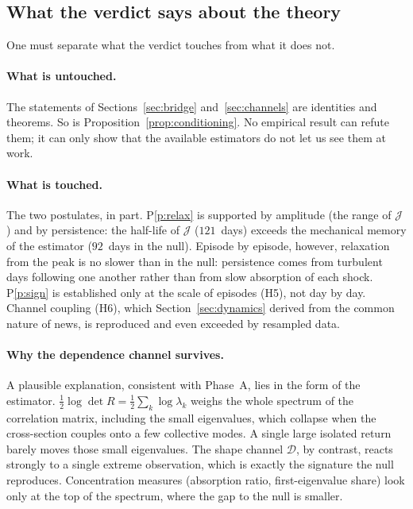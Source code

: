 \documentclass[11pt]{article}
\theoremstyle{definition}
\theoremstyle{remark}
\newcommand{\JJ}{\mathcal{J}}
\newcommand{\DD}{\mathcal{D}}
\begin{document}
\subsection{What the verdict says about the theory}

One must separate what the verdict touches from what it does not.

\paragraph{What is untouched.} The statements of Sections~\ref{sec:bridge}
and~\ref{sec:channels} are identities and theorems. So is
Proposition~\ref{prop:conditioning}. No empirical result can refute them; it can
only show that the available estimators do not let us see them at work.

\paragraph{What is touched.} The two postulates, in part. P\ref{p:relax} is
supported by amplitude (the range of $\JJ$) and by persistence: the half-life of
$\JJ$ ($121$~days) exceeds the mechanical memory of the estimator ($92$~days in
the null). Episode by episode, however, relaxation from the peak is no slower
than in the null: persistence comes from turbulent days following one another
rather than from slow absorption of each shock. P\ref{p:sign} is established
only at the scale of episodes (H5), not day by day. Channel coupling (H6), which Section~\ref{sec:dynamics}
derived from the common nature of news, is reproduced and even exceeded by
resampled data.

\paragraph{Why the dependence channel survives.} A plausible explanation,
consistent with Phase~A, lies in the form of the estimator.
$\tfrac12\log\det R=\tfrac12\sum_k\log\lambda_k$ weighs the whole spectrum of the
correlation matrix, including the small eigenvalues, which collapse when the
cross-section couples onto a few collective modes. A single large isolated return
barely moves those small eigenvalues. The shape channel $\DD$, by contrast,
reacts strongly to a single extreme observation, which is exactly the signature
the null reproduces. Concentration measures (absorption ratio, first-eigenvalue
share) look only at the top of the spectrum, where the gap to the null is
smaller.
\end{document}
